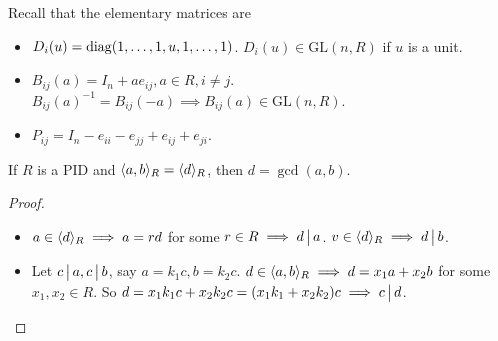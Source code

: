 Recall that the elementary matrices are
\begin{itemize}
  \item $D_i(u) = \operatorname{diag}(1,\dots,1,u,1, \dots,1)$.
    $D_i(u) \in \text{GL}(n, R)$ if $u$ is a unit.
  \item $B_{ij}(a) = I_n + ae_{ij}, a\in R, i \ne j$.
    $B_{ij}(a)^{-1} = B_{ij}(-a) \implies B_{ij}(a) \in \text{GL}(n, R)$.
  \item $P_{ij} = I_n - e_{ii} - e_{jj} + e_{ij} + e_{ji}$.
\end{itemize}

\begin{fact}
  If $R$ is a PID and $\langle a, b\rangle_R = \langle d\rangle_R$, then $d = \gcd(a, b)$.
  \begin{proof} \mbox{}
    \begin{itemize}
      \item
        $a \in \langle d\rangle_R \implies a = rd$ for some $r \in R \implies d \,\big|\, a$.
        $v \in \langle d\rangle_R \implies d \,\big|\, b$.
      \item Let $c \,\big|\, a, c \,\big|\, b$, say $a = k_1c, b = k_2c$.
      $d \in \langle a, b\rangle_R \implies d = x_1a + x_2b$ for some $x_1, x_2 \in R$.
      So $d = x_1k_1c + x_2k_2c = (x_1k_1 + x_2k_2)c \implies c \,\big|\, d$.
      \qedhere
    \end{itemize}
  \end{proof}
\end{fact}

